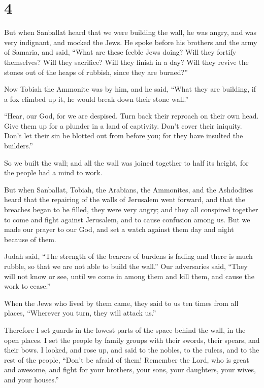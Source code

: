 \hypertarget{section-3}{%
\section{4}\label{section-3}}

 But when Sanballat heard that we were building the wall,
he was angry, and was very indignant, and mocked the Jews.
 He spoke before his brothers and the army of Samaria, and
said, ``What are these feeble Jews doing? Will they fortify themselves?
Will they sacrifice? Will they finish in a day? Will they revive the
stones out of the heaps of rubbish, since they are burned?''

 Now Tobiah the Ammonite was by him, and he said, ``What
they are building, if a fox climbed up it, he would break down their
stone wall.''

 ``Hear, our God, for we are despised. Turn back their
reproach on their own head. Give them up for a plunder in a land of
captivity.  Don't cover their iniquity. Don't let their
sin be blotted out from before you; for they have insulted the
builders.''

 So we built the wall; and all the wall was joined
together to half its height, for the people had a mind to work.

 But when Sanballat, Tobiah, the Arabians, the Ammonites,
and the Ashdodites heard that the repairing of the walls of Jerusalem
went forward, and that the breaches began to be filled, they were very
angry;  and they all conspired together to come and fight
against Jerusalem, and to cause confusion among us.  But
we made our prayer to our God, and set a watch against them day and
night because of them.

 Judah said, ``The strength of the bearers of burdens is
fading and there is much rubble, so that we are not able to build the
wall.''  Our adversaries said, ``They will not know or
see, until we come in among them and kill them, and cause the work to
cease.''

 When the Jews who lived by them came, they said to us
ten times from all places, ``Wherever you turn, they will attack us.''

 Therefore I set guards in the lowest parts of the space
behind the wall, in the open places. I set the people by family groups
with their swords, their spears, and their bows.  I
looked, and rose up, and said to the nobles, to the rulers, and to the
rest of the people, ``Don't be afraid of them! Remember the Lord, who is
great and awesome, and fight for your brothers, your sons, your
daughters, your wives, and your houses.''

